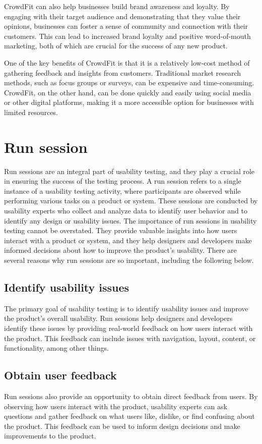 CrowdFit can also help businesses build brand awareness and loyalty. By engaging with their target audience and demonstrating that they 
value their opinions, businesses can foster a sense of community and connection with their customers. This can lead to increased brand 
loyalty and positive word-of-mouth marketing, both of which are crucial for the success of any new product.

One of the key benefits of CrowdFit is that it is a relatively low-cost method of gathering feedback and insights from customers. 
Traditional market research methods, such as focus groups or surveys, can be expensive and time-consuming. CrowdFit, on the other hand, 
can be done quickly and easily using social media or other digital platforms, making it a more accessible option for businesses with limited resources.

\section{Run session}
Run sessions are an integral part of usability testing, and they play a crucial role in ensuring the success of the testing process. 
A run session refers to a single instance of a usability testing activity, where participants are observed while performing various 
tasks on a product or system. These sessions are conducted by usability experts who collect and analyze data to identify user behavior 
and to identify any design or usability issues.
The importance of run sessions in usability testing cannot be overstated. They provide valuable insights into how users interact with a 
product or system, and they help designers and developers make informed decisions about how to improve the product's usability. 
There are several reasons why run sessions are so important, including the following below.

\subsection{Identify usability issues}
The primary goal of usability testing is to identify usability issues and improve the product's overall usability. 
Run sessions help designers and developers identify these issues by providing real-world feedback on how users interact 
with the product. This feedback can include issues with navigation, layout, content, or functionality, among other things.

\subsection{Obtain user feedback}
Run sessions also provide an opportunity to obtain direct feedback from users. By observing how users interact 
with the product, usability experts can ask questions and gather feedback on what users like, dislike, or find 
confusing about the product. This feedback can be used to inform design decisions and make improvements to the product.

